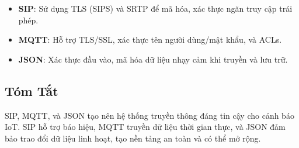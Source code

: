 \begin{itemize}
    \item \textbf{SIP}: Sử dụng TLS (SIPS) và SRTP để mã hóa, xác thực ngăn truy cập trái phép.
    \item \textbf{MQTT}: Hỗ trợ TLS/SSL, xác thực tên người dùng/mật khẩu, và ACLs.
    \item \textbf{JSON}: Xác thực đầu vào, mã hóa dữ liệu nhạy cảm khi truyền và lưu trữ.
\end{itemize}

\subsection{Tóm Tắt}
\label{subsec:protocol_summary}

SIP, MQTT, và JSON tạo nên hệ thống truyền thông đáng tin cậy cho cảnh báo IoT. SIP hỗ trợ báo hiệu, MQTT truyền dữ liệu thời gian thực, và JSON đảm bảo trao đổi dữ liệu linh hoạt, tạo nền tảng an toàn và có thể mở rộng.
